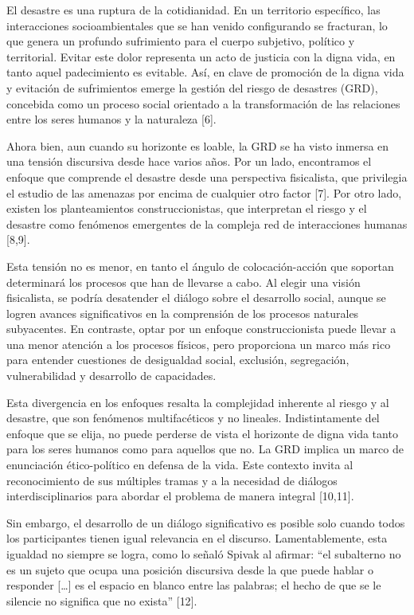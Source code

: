 \documentclass[
  spanish,
  letterpaper,
]{book}
\begin{document}
El desastre es una ruptura de la cotidianidad. En un territorio
específico, las interacciones socioambientales que se han venido
configurando se fracturan, lo que genera un profundo sufrimiento para el
cuerpo subjetivo, político y territorial. Evitar este dolor representa
un acto de justicia con la digna vida, en tanto aquel padecimiento es
evitable. Así, en clave de promoción de la digna vida y evitación de
sufrimientos emerge la gestión del riesgo de desastres (GRD), concebida
como un proceso social orientado a la transformación de las relaciones
entre los seres humanos y la naturaleza {[}6{]}.

Ahora bien, aun cuando su horizonte es loable, la GRD se ha visto
inmersa en una tensión discursiva desde hace varios años. Por un lado,
encontramos el enfoque que comprende el desastre desde una perspectiva
fisicalista, que privilegia el estudio de las amenazas por encima de
cualquier otro factor {[}7{]}. Por otro lado, existen los planteamientos
construccionistas, que interpretan el riesgo y el desastre como
fenómenos emergentes de la compleja red de interacciones humanas
{[}8,9{]}.

Esta tensión no es menor, en tanto el ángulo de colocación-acción que
soportan determinará los procesos que han de llevarse a cabo. Al elegir
una visión fisicalista, se podría desatender el diálogo sobre el
desarrollo social, aunque se logren avances significativos en la
comprensión de los procesos naturales subyacentes. En contraste, optar
por un enfoque construccionista puede llevar a una menor atención a los
procesos físicos, pero proporciona un marco más rico para entender
cuestiones de desigualdad social, exclusión, segregación, vulnerabilidad
y desarrollo de capacidades.

Esta divergencia en los enfoques resalta la complejidad inherente al
riesgo y al desastre, que son fenómenos multifacéticos y no lineales.
Indistintamente del enfoque que se elija, no puede perderse de vista el
horizonte de digna vida tanto para los seres humanos como para aquellos
que no. La GRD implica un marco de enunciación ético-político en defensa
de la vida. Este contexto invita al reconocimiento de sus múltiples
tramas y a la necesidad de diálogos interdisciplinarios para abordar el
problema de manera integral {[}10,11{]}.

Sin embargo, el desarrollo de un diálogo significativo es posible solo
cuando todos los participantes tienen igual relevancia en el discurso.
Lamentablemente, esta igualdad no siempre se logra, como lo señaló
Spivak al afirmar: ``el subalterno no es un sujeto que ocupa una
posición discursiva desde la que puede hablar o responder {[}\ldots{]}
es el espacio en blanco entre las palabras; el hecho de que se le
silencie no significa que no exista'' {[}12{]}.
\end{document}
